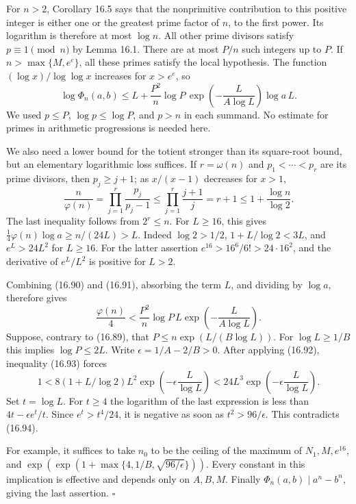 \documentclass[
  11pt,
  a4paper,
]{article}
\begin{document}
For \(n>2\), Corollary 16.5 says that the nonprimitive contribution to
this positive integer is either one or the greatest prime factor of
\(n\), to the first power. Its logarithm is therefore at most
\(\log n\). All other prime divisors satisfy \(p\equiv1\pmod n\) by
Lemma 16.1. There are at most \(P/n\) such integers up to \(P\). If
\(n>\max\{M,e^e\}\), all these primes satisfy the local hypothesis. The
function \((\log x)/\log\log x\) increases for \(x>e^e\), so \[
 \log\Phi_n(a,b)\le
 L+\frac{P^2}{n}\log P\,
       \exp\!\left(-\frac{L}{A\log L}\right)\log a\,L.
 \tag{16.91}
\] We used \(p\le P\), \(\log p\le\log P\), and \(p>n\) in each summand.
No estimate for primes in arithmetic progressions is needed here.

We also need a lower bound for the totient stronger than its square-root
bound, but an elementary logarithmic loss suffices. If \(r=\omega(n)\)
and \(p_1<\cdots<p_r\) are its prime divisors, then \(p_j\ge j+1\); as
\(x/(x-1)\) decreases for \(x>1\), \[
 \frac n{\varphi(n)}
 =\prod_{j=1}^r\frac{p_j}{p_j-1}
 \le\prod_{j=1}^r\frac{j+1}{j}
 =r+1\le1+\frac{\log n}{\log2}.
 \tag{16.92}
\] The last inequality follows from \(2^r\le n\). For \(L\ge16\), this
gives \(\tfrac14\varphi(n)\log a\ge n/(24L)>L\). Indeed \(\log2>1/2\),
\(1+L/\log2<3L\), and \(e^L>24L^2\) for \(L\ge16\). For the latter
assertion \(e^{16}>16^6/6!>24\cdot16^2\), and the derivative of
\(e^L/L^2\) is positive for \(L>2\).

Combining (16.90) and (16.91), absorbing the term \(L\), and dividing by
\(\log a\), therefore gives \[
 \frac{\varphi(n)}4<
 \frac{P^2}{n}\log P\,L
       \exp\!\left(-\frac{L}{A\log L}\right).
 \tag{16.93}
\] Suppose, contrary to (16.89), that \(P\le n\exp(L/(B\log L))\). For
\(\log L\ge1/B\) this implies \(\log P\le2L\). Write
\(\epsilon=1/A-2/B>0\). After applying (16.92), inequality (16.93)
forces \[
 1<8(1+L/\log2)L^2
           \exp\!\left(-\epsilon\frac{L}{\log L}\right)
 <24L^3\exp\!\left(-\epsilon\frac{L}{\log L}\right).
 \tag{16.94}
\] Set \(t=\log L\). For \(t\ge4\) the logarithm of the last expression
is less than \(4t-\epsilon e^t/t\). Since \(e^t>t^4/24\), it is negative
as soon as \(t^2>96/\epsilon\). This contradicts (16.94).

For example, it suffices to take \(n_0\) to be the ceiling of the
maximum of \(N_1,M,e^{16}\), and
\(\exp(\exp(1+\max\{4,1/B,\sqrt{96/\epsilon}\}))\). Every constant in
this implication is effective and depends only on \(A,B,M\). Finally
\(\Phi_n(a,b)\mid a^n-b^n\), giving the last assertion. \(\square\)
\end{document}
